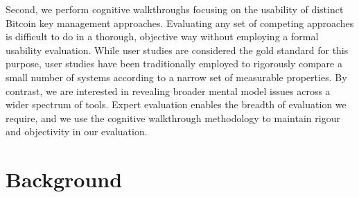 Second, we perform cognitive walkthroughs focusing on the usability of  distinct Bitcoin key management approaches. Evaluating any set of competing approaches is difficult to do in a thorough, objective way without employing a formal usability evaluation. While user studies are considered the gold standard for this purpose, user studies have been traditionally employed to rigorously compare a small number of systems according to a narrow set of measurable properties. By contrast, we are interested in revealing broader mental model issues across a wider spectrum of tools. Expert evaluation enables the breadth of evaluation we require, and we use the cognitive walkthrough methodology to maintain rigour and objectivity in our evaluation. 




\section{Background}
